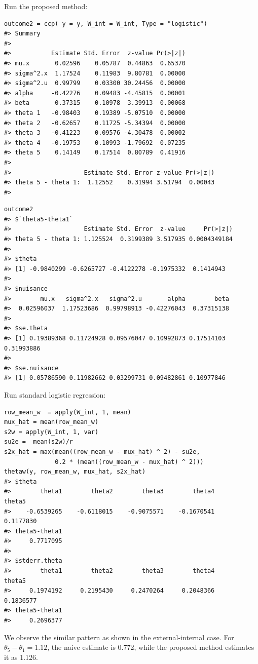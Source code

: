 \documentclass[15 pt,]{article}
\begin{document}
Run the proposed method:

\begin{verbatim}
outcome2 = ccp( y = y, W_int = W_int, Type = "logistic")
#> Summary 
#>   
#>           Estimate Std. Error  z-value Pr(>|z|)
#> mu.x       0.02596    0.05787  0.44863  0.65370
#> sigma^2.x  1.17524    0.11983  9.80781  0.00000
#> sigma^2.u  0.99799    0.03300 30.24456  0.00000
#> alpha     -0.42276    0.09483 -4.45815  0.00001
#> beta       0.37315    0.10978  3.39913  0.00068
#> theta 1   -0.98403    0.19389 -5.07510  0.00000
#> theta 2   -0.62657    0.11725 -5.34394  0.00000
#> theta 3   -0.41223    0.09576 -4.30478  0.00002
#> theta 4   -0.19753    0.10993 -1.79692  0.07235
#> theta 5    0.14149    0.17514  0.80789  0.41916
#>   
#>                    Estimate Std. Error z-value Pr(>|z|)
#> theta 5 - theta 1:  1.12552    0.31994 3.51794  0.00043
#> 
\end{verbatim}

\begin{verbatim}
outcome2
#> $`theta5-theta1`
#>                    Estimate Std. Error  z-value     Pr(>|z|)
#> theta 5 - theta 1: 1.125524  0.3199389 3.517935 0.0004349184
#> 
#> $theta
#> [1] -0.9840299 -0.6265727 -0.4122278 -0.1975332  0.1414943
#> 
#> $nuisance
#>        mu.x   sigma^2.x   sigma^2.u       alpha        beta 
#>  0.02596037  1.17523686  0.99798913 -0.42276043  0.37315138 
#> 
#> $se.theta
#> [1] 0.19389368 0.11724928 0.09576047 0.10992873 0.17514103 0.31993886
#> 
#> $se.nuisance
#> [1] 0.05786590 0.11982662 0.03299731 0.09482861 0.10977846
\end{verbatim}

Run standard logistic regression:

\begin{verbatim}
row_mean_w  = apply(W_int, 1, mean)
mux_hat = mean(row_mean_w)
s2w = apply(W_int, 1, var)
su2e =  mean(s2w)/r   
s2x_hat = max(mean((row_mean_w - mux_hat) ^ 2) - su2e, 
              0.2 * (mean((row_mean_w - mux_hat) ^ 2)))
thetaw(y, row_mean_w, mux_hat, s2x_hat)
#> $theta
#>        theta1        theta2        theta3        theta4        theta5 
#>    -0.6539265    -0.6118015    -0.9075571    -0.1670541     0.1177830 
#> theta5-theta1 
#>     0.7717095 
#> 
#> $stderr.theta
#>        theta1        theta2        theta3        theta4        theta5 
#>     0.1974192     0.2195430     0.2470264     0.2048366     0.1836577 
#> theta5-theta1 
#>     0.2696377
\end{verbatim}

We observe the similar pattern as shown in the external-internal case.
For \(\theta_5- \theta_1 = 1.12\), the naive estimate is 0.772, while
the proposed method estimates it as 1.126.
\end{document}
